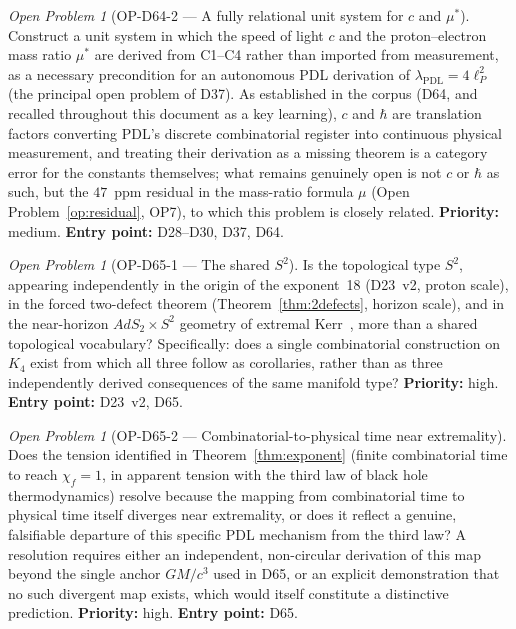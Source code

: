 \documentclass[11pt,a4paper]{article}
\theoremstyle{plain}
\theoremstyle{definition}
\theoremstyle{remark}
\newtheorem{openproblem}[theorem]{Open Problem}
\newcommand{\Kfour}{K_4}
\begin{document}
\begin{openproblem}[OP-D64-2 --- A fully relational unit system for $c$ and $\mu^*$]
\label{op:D64two}
Construct a unit system in which the speed of light $c$ and the proton--electron mass ratio $\mu^*$ are derived from C1--C4 rather than imported from measurement, as a necessary precondition for an autonomous PDL derivation of $\lambda_{\mathrm{PDL}}=4\ell_P^2$ (the principal open problem of D37). As established in the corpus (D64, and recalled throughout this document as a key learning), $c$ and $\hbar$ are translation factors converting PDL's discrete combinatorial register into continuous physical measurement, and treating their derivation as a missing theorem is a category error for the constants themselves; what remains genuinely open is not $c$ or $\hbar$ as such, but the $47$~ppm residual in the mass-ratio formula $\mu$ (Open Problem~\ref{op:residual}, OP7), to which this problem is closely related. \textbf{Priority:} medium. \textbf{Entry point:} D28--D30, D37, D64.
\end{openproblem}

\begin{openproblem}[OP-D65-1 --- The shared $S^2$]
\label{op:D65one}
Is the topological type $S^2$, appearing independently in the origin of the exponent~18 (D23~v2, proton scale), in the forced two-defect theorem (Theorem~\ref{thm:2defects}, horizon scale), and in the near-horizon $AdS_2\times S^2$ geometry of extremal Kerr~\cite{GuicaHartmanSongStrominger2009}, more than a shared topological vocabulary? Specifically: does a single combinatorial construction on $\Kfour$ exist from which all three follow as corollaries, rather than as three independently derived consequences of the same manifold type? \textbf{Priority:} high. \textbf{Entry point:} D23~v2, D65.
\end{openproblem}

\begin{openproblem}[OP-D65-2 --- Combinatorial-to-physical time near extremality]
\label{op:D65two}
Does the tension identified in Theorem~\ref{thm:exponent} (finite combinatorial time to reach $\chi_f=1$, in apparent tension with the third law of black hole thermodynamics) resolve because the mapping from combinatorial time to physical time itself diverges near extremality, or does it reflect a genuine, falsifiable departure of this specific PDL mechanism from the third law? A resolution requires either an independent, non-circular derivation of this map beyond the single anchor $GM/c^3$ used in D65, or an explicit demonstration that no such divergent map exists, which would itself constitute a distinctive prediction. \textbf{Priority:} high. \textbf{Entry point:} D65.
\end{openproblem}
\end{document}
